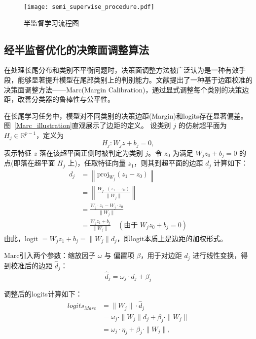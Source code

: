 \documentclass[master]{thesis-uestc}
\begin{document}
\begin{figure}[h]
    \centering
    \texttt{[image: semi\_supervise\_procedure.pdf]}
    \caption{半监督学习流程图}
    \label{semi_supervise_procedure}
\end{figure}

\subsection{经半监督优化的决策面调整算法}

在处理长尾分布和类别不平衡问题时，决策面调整方法被广泛认为是一种有效手段，能够显著提升模型在尾部类别上的判别能力。文献提出了一种基于边距校准的决策面调整方法——Marc(Margin Calibration)，通过显式调整每个类别的决策边距，改善分类器的鲁棒性与公平性。

在长尾学习任务中，模型对不同类别的决策边距(Margin)和logits存在显著偏差。图~\ref{Marc_illustration}直观展示了边距的定义。
设类别 $j$ 的仿射超平面为 $H_j \in \mathbb{R}^{p-1}$，定义为
\[
H_j: W_j z + b_j = 0,
\]
表示特征 $z$ 落在该超平面正侧时被判定为类别 $j$。令 $z_0$ 为满足 $W_j z_0 + b_j = 0$ 的点(即落在超平面 $H_j$ 上)，任取特征向量 $z_1$，则其到超平面的边距 $d_j$ 计算如下：
\begin{equation}
    \begin{split}
        d_j &= \left\| \text{proj}_{W_j}(z_1 - z_0) \right\| \\
            &= \left\| \frac{W_j \cdot (z_1 - z_0)}{\|W_j\|} \right\| \\
            &= \frac{W_j \cdot z_1 - W_j \cdot z_0}{\|W_j\|} \\
            &= \frac{W_j z_1 + b_j}{\|W_j\|} \quad (\text{由于 } W_j z_0 + b_j = 0)
    \end{split}
\end{equation}
由此，logit $= W_j z_1 + b_j = \|W_j\| d_j$，即logit本质上是边距的加权形式。

Marc引入两个参数：缩放因子 $\omega$ 与 偏置项 $\beta$，用于对边距 $d_j$ 进行线性变换，得到校准后的边距 $\hat{d}_j$：
\begin{equation}
    \hat{d}_j = \omega_j \cdot d_j + \beta_j
\end{equation}

调整后的logits计算如下：
\begin{equation}
    \begin{split}
        logits_{Marc} &= \| W_j \| \cdot \hat{d}_j \\
                      &= \omega_j \cdot \|W_j\| d_j + \beta_j \cdot \|W_j\| \\
                      &= \omega_j \cdot \eta_j + \beta_j \cdot \|W_j\|,
    \end{split}
\end{equation}
\end{document}
